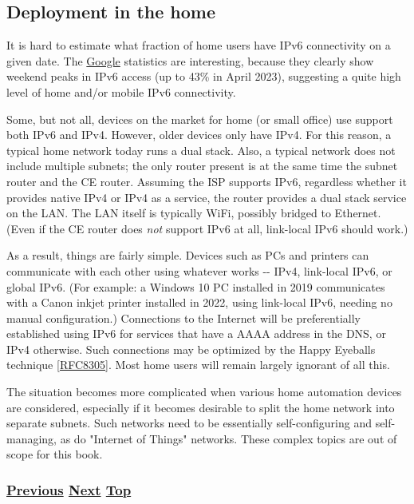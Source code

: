 \documentclass[
]{article}
\begin{document}
\pagebreak

\subsection{Deployment in the home}\label{deployment-in-the-home}

It is hard to estimate what fraction of home users have IPv6
connectivity on a given date. The
\href{https://www.google.com/intl/en/ipv6/statistics.html}{Google}
statistics are interesting, because they clearly show weekend peaks in
IPv6 access (up to 43\% in April 2023), suggesting a quite high level of
home and/or mobile IPv6 connectivity.

Some, but not all, devices on the market for home (or small office) use
support both IPv6 and IPv4. However, older devices only have IPv4. For
this reason, a typical home network today runs a dual stack. Also, a
typical network does not include multiple subnets; the only router
present is at the same time the subnet router and the CE router.
Assuming the ISP supports IPv6, regardless whether it provides native
IPv4 or IPv4 as a service, the router provides a dual stack service on
the LAN. The LAN itself is typically WiFi, possibly bridged to Ethernet.
(Even if the CE router does \emph{not} support IPv6 at all, link-local
IPv6 should work.)

As a result, things are fairly simple. Devices such as PCs and printers
can communicate with each other using whatever works -\/- IPv4,
link-local IPv6, or global IPv6. (For example: a Windows 10 PC installed
in 2019 communicates with a Canon inkjet printer installed in 2022,
using link-local IPv6, needing no manual configuration.) Connections to
the Internet will be preferentially established using IPv6 for services
that have a AAAA address in the DNS, or IPv4 otherwise. Such connections
may be optimized by the Happy Eyeballs technique
{[}\href{https://www.rfc-editor.org/info/rfc8305}{RFC8305}{]}. Most home
users will remain largely ignorant of all this.

The situation becomes more complicated when various home automation
devices are considered, especially if it becomes desirable to split the
home network into separate subnets. Such networks need to be essentially
self-configuring and self-managing, as do "Internet of Things" networks.
These complex topics are out of scope for this book.

\subsubsection{\texorpdfstring{\hyperref[deployment-by-carriers]{Previous}
\hyperref[deployment-in-the-enterprise]{Next}
\hyperref[deployment-status]{Top}}{Previous Next Top}}\label{previous-next-top-37}
\end{document}
